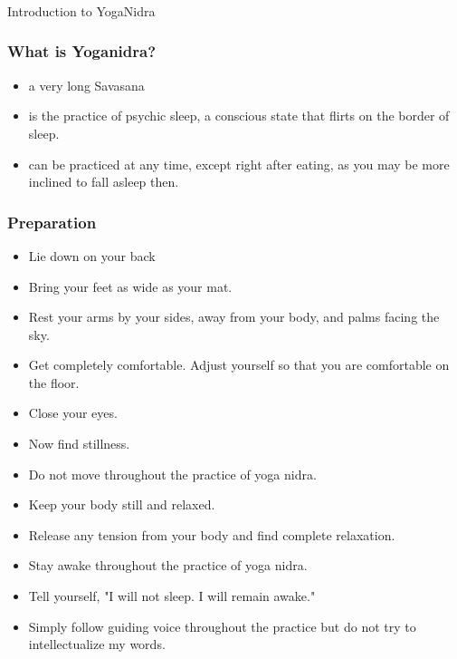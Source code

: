 \begin{frame}[fragile]\frametitle{}
\begin{center}
{\Large Introduction to YogaNidra}
\end{center}
\end{frame}

\begin{frame}[fragile]\frametitle{What is Yoganidra?}
	\begin{itemize}
	\item a very long Savasana
	\item is the practice of psychic sleep, a conscious state that flirts on the border of sleep.
	\item can be practiced at any time, except right after eating, as you may be more inclined to fall asleep then.
	\end{itemize}

\end{frame}

\begin{frame}[fragile]\frametitle{Preparation}
	\begin{itemize}
	\item Lie down on your back 
	\item Bring your feet as wide as your mat. 
	\item Rest your arms by your sides, away from your body, and palms facing the sky. 
	\item Get completely comfortable. Adjust yourself so that you are comfortable on the floor. 
	\item Close your eyes. 
	\item Now find stillness. 
	\item Do not move throughout the practice of yoga nidra. 
	\item Keep your body still and relaxed. 
	\item Release any tension from your body and find complete relaxation. 
	\item Stay awake throughout the practice of yoga nidra. 
	\item Tell yourself, "I will not sleep. I will remain awake." 
	\item Simply follow guiding voice throughout the practice but do not try to intellectualize my words. 
	\end{itemize}

\end{frame}

